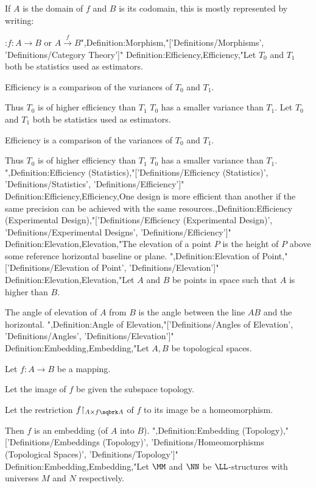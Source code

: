 If $A$ is the domain of $f$ and $B$ is its codomain, this is mostly represented by writing:

:$f: A \to B$ or $A \stackrel f \longrightarrow B$",Definition:Morphism,"['Definitions/Morphisms', 'Definitions/Category Theory']"
Definition:Efficiency,Efficiency,"Let $T_0$ and $T_1$ both be statistics used as estimators.

Efficiency is a comparison of the variances of $T_0$ and $T_1$.


Thus $T_0$ is of higher efficiency than $T_1$  $T_0$ has a smaller variance than $T_1$.
Let $T_0$ and $T_1$ both be statistics used as estimators.

Efficiency is a comparison of the variances of $T_0$ and $T_1$.


Thus $T_0$ is of higher efficiency than $T_1$  $T_0$ has a smaller variance than $T_1$.
",Definition:Efficiency (Statistics),"['Definitions/Efficiency (Statistics)', 'Definitions/Statistics', 'Definitions/Efficiency']"
Definition:Efficiency,Efficiency,One design is more efficient than another if the same precision can be achieved with the same resources.,Definition:Efficiency (Experimental Design),"['Definitions/Efficiency (Experimental Design)', 'Definitions/Experimental Designs', 'Definitions/Efficiency']"
Definition:Elevation,Elevation,"The elevation of a point $P$ is the height of $P$ above some reference horizontal baseline or plane.
",Definition:Elevation of Point,"['Definitions/Elevation of Point', 'Definitions/Elevation']"
Definition:Elevation,Elevation,"Let $A$ and $B$ be points in space such that $A$ is higher than $B$.

The angle of elevation of $A$ from $B$ is the angle between the line $AB$ and the horizontal.
",Definition:Angle of Elevation,"['Definitions/Angles of Elevation', 'Definitions/Angles', 'Definitions/Elevation']"
Definition:Embedding,Embedding,"Let $A, B$ be topological spaces.

Let $f: A \to B$ be a mapping.

Let the image of $f$ be given the subspace topology.

Let the restriction $f {\restriction_{A \times f\sqbrk A }}$ of $f$ to its image be a homeomorphism.


Then $f$ is an embedding (of $A$ into $B$).
",Definition:Embedding (Topology),"['Definitions/Embeddings (Topology)', 'Definitions/Homeomorphisms (Topological Spaces)', 'Definitions/Topology']"
Definition:Embedding,Embedding,"Let $\MM$ and $\NN$ be $\LL$-structures with universes $M$ and $N$ respectively.


